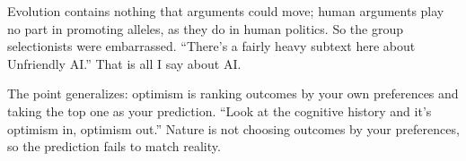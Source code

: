 Evolution contains nothing that arguments could move; human arguments play no part in promoting alleles, as they do in human politics. So the group selectionists were embarrassed. ``There's a fairly heavy subtext here about Unfriendly AI.'' That is all I say about AI.

The point generalizes: optimism is ranking outcomes by your own preferences and taking the top one as your prediction. ``Look at the cognitive history and it's optimism in, optimism out.'' Nature is not choosing outcomes by your preferences, so the prediction fails to match reality. 

